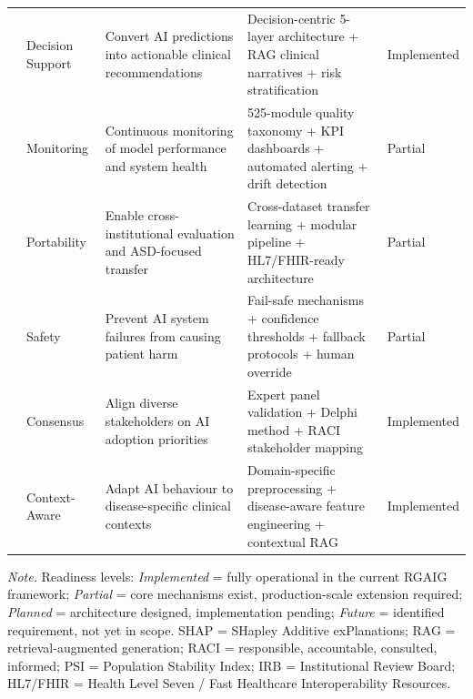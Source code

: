 \begin{table}[!htbp]
\begin{tabularx}{\textwidth}{@{} p{0.4cm} p{2.5cm} L L p{2.2cm} @{}}
 & Decision Support & Convert AI predictions into actionable clinical recommendations & Decision-centric 5-layer architecture + RAG clinical narratives + risk stratification & Implemented \\
 & Monitoring & Continuous monitoring of model performance and system health & 525-module quality taxonomy + KPI dashboards + automated alerting + drift detection & Partial \\
 & Portability & Enable cross-institutional evaluation and ASD-focused transfer & Cross-dataset transfer learning + modular pipeline + HL7/FHIR-ready architecture & Partial \\
 & Safety & Prevent AI system failures from causing patient harm & Fail-safe mechanisms + confidence thresholds + fallback protocols + human override & Partial \\
 & Consensus & Align diverse stakeholders on AI adoption priorities & Expert panel validation + Delphi method + RACI stakeholder mapping & Implemented \\
 & Context-Aware & Adapt AI behaviour to disease-specific clinical contexts & Domain-specific preprocessing + disease-aware feature engineering + contextual RAG & Implemented \\
\bottomrule
\end{tabularx}
\vspace{0.5em}\noindent\textit{Note.} Readiness levels: \textit{Implemented} = fully operational in the current RGAIG framework; \textit{Partial} = core mechanisms exist, production-scale extension required; \textit{Planned} = architecture designed, implementation pending; \textit{Future} = identified requirement, not yet in scope. SHAP = SHapley Additive exPlanations; RAG = retrieval-augmented generation; RACI = responsible, accountable, consulted, informed; PSI = Population Stability Index; IRB = Institutional Review Board; HL7/FHIR = Health Level Seven / Fast Healthcare Interoperability Resources.
\end{table}
\fi

